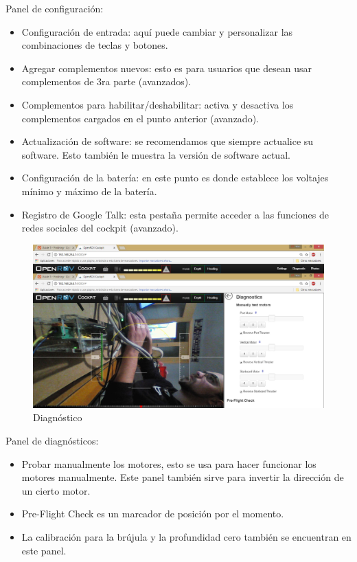 Panel de configuración:
\begin{itemize}
 \item Configuración de entrada: aquí puede cambiar y personalizar las combinaciones de teclas y botones.
 \item Agregar complementos nuevos: esto es para usuarios que desean usar complementos de 3ra parte (avanzados).
 \item Complementos para habilitar/deshabilitar: activa y desactiva los complementos cargados en el punto anterior (avanzado).
 \item Actualización de software: se recomendamos que siempre actualice su software. Esto también le muestra la versión de software actual.
 \item Configuración de la batería: en este punto es donde establece los voltajes mínimo y máximo de la batería.
 \item Registro de Google Talk: esta pestaña permite acceder a las funciones de redes sociales del cockpit (avanzado).
\end{itemize}

\begin{figure} [hbtp]
\begin{center}
  \includegraphics[width=12cm]{img/cap3/3_5/diagnostico}
\end{center}
\caption{Diagnóstico}
\label{fig:diagnostico}
\end{figure}

Panel de diagnósticos:
\begin{itemize}
 \item Probar manualmente los motores, esto se usa para hacer funcionar los motores manualmente. Este panel también sirve para invertir la dirección de un cierto motor.
 \item Pre-Flight Check es un marcador de posición por el momento.
 \item La calibración para la brújula y la profundidad cero también se encuentran en este panel.
\end{itemize}

